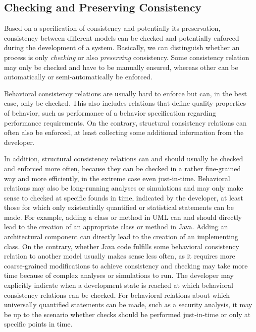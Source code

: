 \subsection{Checking and Preserving Consistency}

Based on a specification of consistency and potentially its preservation, consistency between different models can be checked and potentially enforced during the development of a system.
Basically, we can distinguish whether an process is only \emph{checking} or also \emph{preserving} consistency.
Some consistency relation may only be checked and have to be manually ensured, whereas other can be automatically or semi-automatically be enforced.

Behavioral consistency relations are usually hard to enforce but can, in the best case, only be checked.
This also includes relations that define quality properties of behavior, such as performance of a behavior specification regarding performance requirements.
On the contrary, structural consistency relations can often also be enforced, at least collecting some additional information from the developer.

In addition, structural consistency relations can and should usually be checked and enforced more often, because they can be checked in a rather fine-grained way and more efficiently, in the extreme case even just-in-time.
Behavioral relations may also be long-running analyses or simulations and may only make sense to checked at specific founds in time, indicated by the developer, at least those for which only existentially quantified or statistical statements can be made.
For example, adding a class or method in \gls{UML} can and should directly lead to the creation of an appropriate class or method in Java.
Adding an architectural component can directly lead to the creation of an implementing class.
On the contrary, whether Java code fulfills some behavioral consistency relation to another model usually makes sense less often, as it requires more coarse-grained modifications to achieve consistency and checking may take more time because of complex analyses or simulations to run.
The developer may explicitly indicate when a development state is reached at which behavioral consistency relations can be checked.
For behavioral relations about which universally quantified statements can be made, such as a security analysis, it may be up to the scenario whether checks should be performed just-in-time or only at specific points in time.

